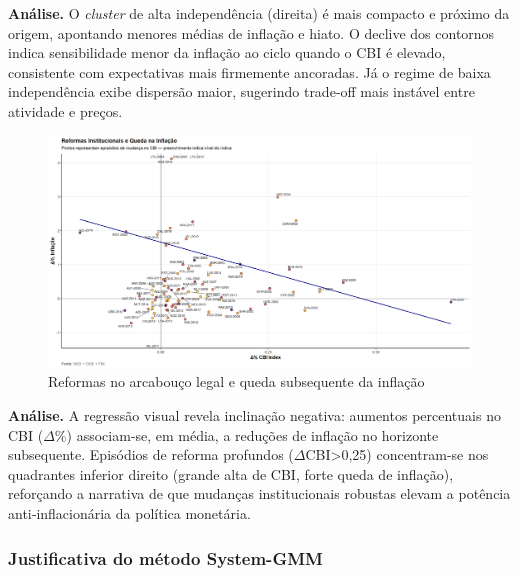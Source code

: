 \documentclass[a4paper,12pt]{article}[abnt2]
\begin{document}
\begin{flushleft}\small
\textbf{Análise.}
O \textit{cluster} de alta independência (direita) é mais compacto e próximo da origem, apontando menores médias de inflação e hiato.  
O declive dos contornos indica sensibilidade menor da inflação ao ciclo quando o CBI é elevado, consistente com expectativas mais firmemente ancoradas.  
Já o regime de baixa independência exibe dispersão maior, sugerindo trade‑off mais instável entre atividade e preços.
\end{flushleft}

\begin{figure}[H]
    \centering
    \caption{Reformas no arcabouço legal e queda subsequente da inflação}
    \label{fig:reforms}
    \includegraphics[width=.85\linewidth]{Imagens/an1i10.png}
\end{figure}

\begin{flushleft}\small
\textbf{Análise.}
A regressão visual revela inclinação negativa: aumentos percentuais no CBI (\(\Delta\%\)) associam‑se, em média, a reduções de inflação no horizonte subsequente.  
Episódios de reforma profundos (\(\Delta\)CBI{>}0,25) concentram‑se nos quadrantes inferior direito (grande alta de CBI, forte queda de inflação), reforçando a narrativa de que mudanças institucionais robustas elevam a potência anti‑inflacionária da política monetária.
\end{flushleft}


\subsubsection{\textbf{Justificativa do método System-GMM}}
\end{document}
